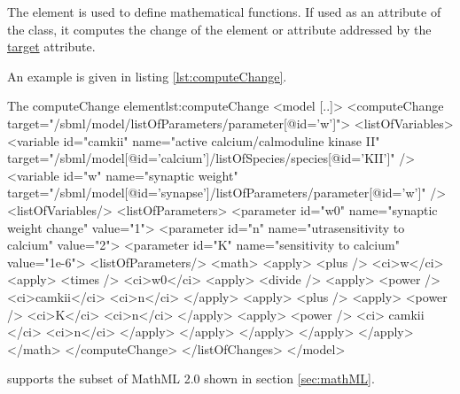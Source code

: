 The  element is used to define mathematical functions. 
If used as an attribute of the  class, it computes the change of the element or attribute addressed by the \hyperref[sec:target]{target} attribute.

An example is given in listing \ref{lst:computeChange}.
%
\begin{myXmlLst}{The computeChange element}{lst:computeChange}
<model [..]>
    <computeChange target="/sbml/model/listOfParameters/parameter[@id='w']">
      <listOfVariables>
        <variable id="camkii" name="active calcium/calmoduline kinase II" 
                  target="/sbml/model[@id='calcium']/listOfSpecies/species[@id='KII']" />
        <variable id="w" name="synaptic weight"
                  target="/sbml/model[@id='synapse']/listOfParameters/parameter[@id='w']" />
      <listOfVariables/>
      <listOfParameters>
        <parameter id="w0" name="synaptic weight change" value="1">
        <parameter id="n" name="utrasensitivity to calcium" value="2">
        <parameter id="K" name="sensitivity to calcium" value="1e-6">
      <listOfParameters/>
      <math>
         <apply>
           <plus />
           <ci>w</ci>
           <apply>
             <times />
             <ci>w0</ci>
             <apply>
               <divide />
               <apply>
                 <power />
                 <ci>camkii</ci>
                 <ci>n</ci>
               </apply>
               <apply>
                 <plus />
                 <apply>
                   <power />
                   <ci>K</ci>
                   <ci>n</ci>
                 </apply>
                 <apply>
                   <power />
                   <ci> camkii </ci>
                   <ci>n</ci>
                 </apply>
               </apply>
             </apply>
           </apply> 
         </apply>
      </math>
    </computeChange>
  </listOfChanges>
</model>
\end{myXmlLst}

\LoneVone supports the subset of MathML 2.0 shown in section \ref{sec:mathML}.
%




